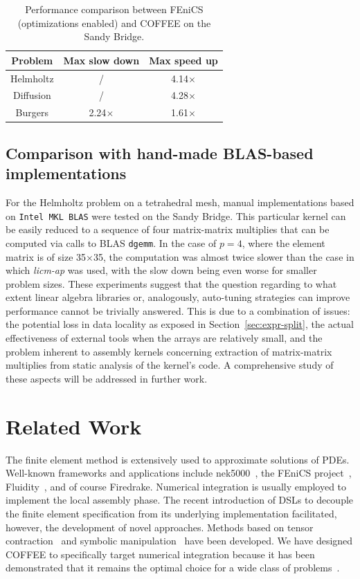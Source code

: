 \documentclass[conference]{IEEEtran}
\begin{document}
\begin{table}[h]
\begin{center}
\begin{tabulary}{1.0\columnwidth}{|C|C|C|}
\hline
Problem & Max slow down & Max speed up \\\hline\hline
Helmholtz & / & 4.14$\times$ \\
Diffusion & / & 4.28$\times$ \\
Burgers & 2.24$\times$ & 1.61$\times$ \\\hline
\end{tabulary}
\end{center}
\caption{Performance comparison between FEniCS (optimizations enabled) and COFFEE on the Sandy Bridge.}
\label{table:comparison-to-FFC-opt}
\end{table}

\subsection{Comparison with hand-made BLAS-based implementations}
\label{sec:perf-eval-blas}
For the Helmholtz problem on a tetrahedral mesh, manual implementations based on \texttt{Intel MKL BLAS} were tested on the Sandy Bridge. This particular kernel can be easily reduced to a sequence of four matrix-matrix multiplies that can be computed via calls to BLAS \texttt{dgemm}. In the case of $p=4$, where the element matrix is of size 35$\times$35, the computation was almost twice slower than the case in which \emph{licm-ap} was used, with the slow down being even worse for smaller problem sizes. These experiments suggest that the question regarding to what extent linear algebra libraries or, analogously, auto-tuning strategies can improve performance cannot be trivially answered. This is due to a combination of issues: the potential loss in data locality as exposed in Section~\ref{sec:expr-split}, the actual effectiveness of external tools when the arrays are relatively small, and the problem inherent to assembly kernels concerning extraction of matrix-matrix multiplies from static analysis of the kernel's code. A comprehensive study of these aspects will be addressed in further work. 


\section{Related Work}
\label{sec:related-work}
The finite element method is extensively used to approximate solutions of PDEs. Well-known frameworks and applications include nek5000~\cite{nek5000-web-page}, the FEniCS project~\cite{Fenics}, Fluidity~\cite{fluidity_manual_v4}, and of course Firedrake. Numerical integration is usually employed to implement the local assembly phase. The recent introduction of DSLs to decouple the finite element specification from its underlying implementation facilitated, however, the development of novel approaches. Methods based on tensor contraction~\cite{FFC-Compiler} and symbolic manipulation~\cite{Francis} have been developed. We have designed COFFEE to specifically target numerical integration because it has been demonstrated that it remains the optimal choice for a wide class of problems~\cite{quadrature1}.
\end{document}

